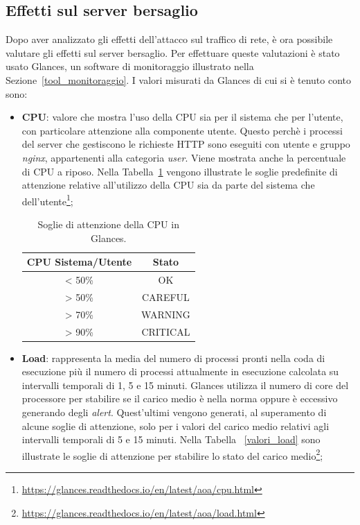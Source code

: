 \subsection{Effetti sul server bersaglio}
Dopo aver analizzato gli effetti dell'attacco sul traffico di rete, è ora possibile valutare gli effetti sul server bersaglio. Per effettuare queste valutazioni è stato usato Glances, un software di monitoraggio illustrato nella Sezione~\ref{tool_monitoraggio}. I valori misurati da Glances di cui si è tenuto conto sono:
\begin{itemize}
    \item \textbf{CPU}: valore che mostra l'uso della CPU sia per il sistema che per l'utente, con particolare attenzione alla componente utente. Questo perchè i processi del server che gestiscono le richieste HTTP sono eseguiti con utente e gruppo \emph{nginx}, appartenenti alla categoria \emph{user}. Viene mostrata anche la percentuale di CPU a riposo. Nella Tabella~\ref{valori_cpu} vengono illustrate le soglie predefinite di attenzione relative all'utilizzo della CPU sia da parte del sistema che dell'utente\footnote{\url{https://glances.readthedocs.io/en/latest/aoa/cpu.html}};
    \begin{table}[H]
        \centering
        \begin{tabular}{c c}
        \hline
        \textbf{CPU Sistema/Utente} & \textbf{Stato} \\
        \hline
        < 50\% & OK \\
        > 50\% & CAREFUL \\
        > 70\% &  WARNING\\
        > 90\% & CRITICAL \\
        \hline
        \end{tabular}
        \caption{Soglie di attenzione della CPU in Glances.}
        \label{valori_cpu}
    \end{table}
    \item \textbf{Load}: rappresenta la media del numero di processi pronti nella coda di esecuzione più il numero di processi attualmente in esecuzione calcolata su intervalli temporali di 1, 5 e 15 minuti. Glances utilizza il numero di core del processore per stabilire se il carico medio è nella norma oppure è eccessivo generando degli \emph{alert}. Quest'ultimi vengono generati, al superamento di alcune soglie di attenzione, solo per i valori del carico medio relativi agli intervalli temporali di 5 e 15 minuti. Nella Tabella ~\ref{valori_load} sono illustrate le soglie di attenzione per stabilire lo stato del carico medio\footnote{\url{https://glances.readthedocs.io/en/latest/aoa/load.html}};

\end{itemize}
